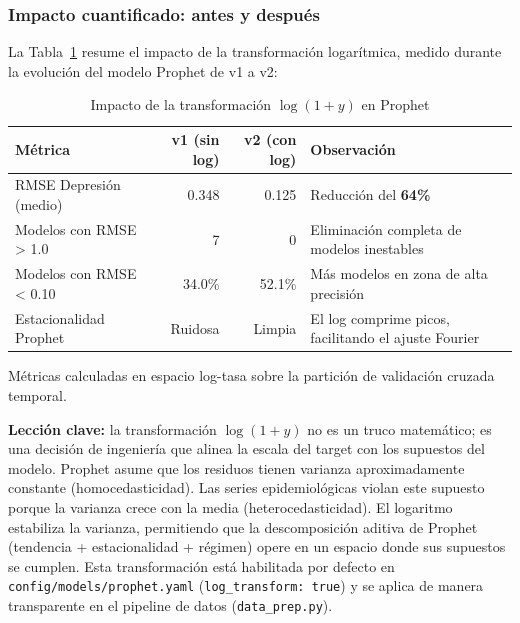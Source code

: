 \documentclass[12pt, letterpaper]{article}
\newenvironment{insightbox}[1][]{\par\medskip\begin{lrbox}{\boxcontents}\begin{minipage}{\dimexpr\textwidth-12pt}\setlength{\emergencystretch}{5em}\setlength{\parskip}{6pt}}{\end{minipage}\end{lrbox}\noindent\colorbox{lightgreen}{\usebox{\boxcontents}}\par\medskip}
\newcommand{\tabref}[1]{Tabla~\ref{#1}}
\begin{document}
\subsubsection*{Impacto cuantificado: antes y después}

La \tabref{tab:log_impact} resume el impacto de la transformación logarítmica, medido durante la evolución del modelo Prophet de v1 a v2:

\begin{table}[H]
\centering
\caption{Impacto de la transformación $\log(1+y)$ en Prophet}
\label{tab:log_impact}
\small
\renewcommand{\arraystretch}{1.2}
\begin{tabularx}{\textwidth}{l r r >{\raggedright\arraybackslash}X}
\toprule
\textbf{Métrica} & \textbf{v1 (sin log)} & \textbf{v2 (con log)} & \textbf{Observación} \\
\midrule
RMSE Depresión (medio) & 0.348 & 0.125 & Reducción del \textbf{64\%} \\
\addlinespace
Modelos con RMSE > 1.0 & 7 & 0 & Eliminación completa de modelos inestables \\
\addlinespace
Modelos con RMSE < 0.10 & 34.0\% & 52.1\% & Más modelos en zona de alta precisión \\
\addlinespace
Estacionalidad Prophet & Ruidosa & Limpia & El log comprime picos, facilitando el ajuste Fourier \\
\bottomrule
\end{tabularx}
\begin{flushleft}
\scriptsize Métricas calculadas en espacio log-tasa sobre la partición de validación cruzada temporal.
\end{flushleft}
\end{table}

\begin{insightbox}
\textbf{Lección clave:} la transformación $\log(1+y)$ no es un truco matemático; es una decisión de ingeniería que alinea la escala del target con los supuestos del modelo. Prophet asume que los residuos tienen varianza aproximadamente constante (homocedasticidad). Las series epidemiológicas violan este supuesto porque la varianza crece con la media (heterocedasticidad). El logaritmo estabiliza la varianza, permitiendo que la descomposición aditiva de Prophet (tendencia + estacionalidad + régimen) opere en un espacio donde sus supuestos se cumplen. Esta transformación está habilitada por defecto en \texttt{config/models/prophet.yaml} (\texttt{log\_transform: true}) y se aplica de manera transparente en el pipeline de datos (\texttt{data\_prep.py}).
\end{insightbox}
\end{document}
